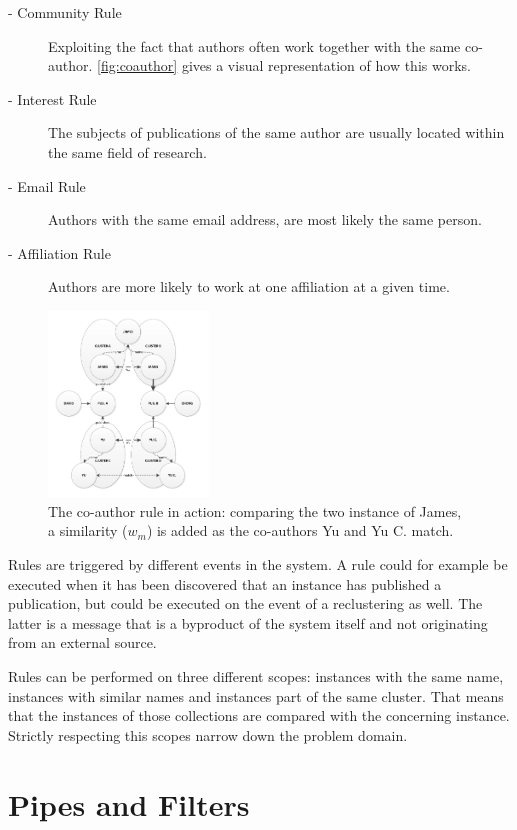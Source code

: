 \documentclass[9pt, twocolumn]{phdsymp} %
\begin{document}
\begin{description}
	\item[- Community Rule] Exploiting the fact that authors often work together with the same co-author. \autoref{fig:coauthor} gives a visual representation of how this works.
	\item[- Interest Rule] The subjects of publications of the same author are usually located within the same field of research.
	\item[- Email Rule] Authors with the same email address, are most likely the same person.
	\item[- Affiliation Rule] Authors are more likely to work at one affiliation at a given time.
\end{description}

\begin{figure}[ht!]
	\centering
	\includegraphics[width= 0.38\textwidth]{fig/coauthorrulenameeq.pdf}
	\caption{The co-author rule in action: comparing the two instance of James, a similarity ($w_m$) is added as the co-authors Yu and Yu C. match.}
	\label{fig:coauthor}
\end{figure}

Rules are triggered by different events in the system. A rule could for example be executed when it has been discovered that an instance has published a publication, but could be executed on the event of a reclustering as well. The latter is a message that is a byproduct of the system itself and not originating from an external source.

Rules can be performed on three different scopes: instances with the same name, instances with similar names and instances part of the same cluster. That means that the instances of those collections are compared with the concerning instance. Strictly respecting this scopes narrow down the problem domain.

\section{Pipes and Filters}
\label{pipes}
\end{document}

